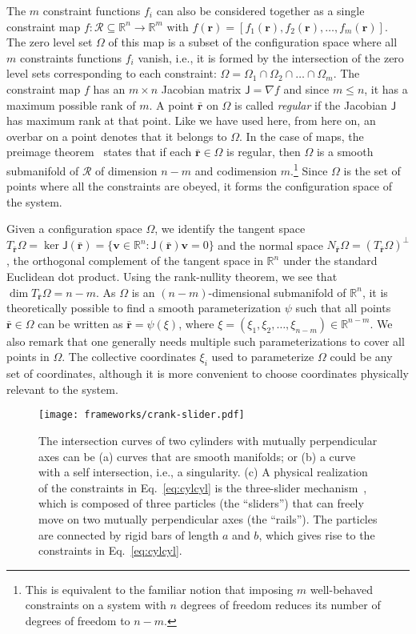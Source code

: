 The $m$ constraint functions $f_i$ can also be considered together as a single constraint map $f: \mathscr{R} \subseteq \mathbb{R}^n \to \mathbb{R}^m$ with $f(\bm{r}) = [f_1(\bm{r}), f_2(\bm{r}), \dots, f_m(\bm{r})]$.
The zero level set $\Omega$ of this map is a subset of the configuration space where all $m$ constraints functions $f_i$ vanish, i.e., it is formed by the intersection of the zero level sets corresponding to each constraint: $\Omega = \Omega_1 \cap \Omega_2 \cap \dots \cap \Omega_m$.
The constraint map $f$ has an $m\times n$ Jacobian matrix $\mathsf{J} = \nabla f$ and since $m\leq n$, it has a maximum possible rank of $m$.
A point $\bar{\bm{r}}$ on $\Omega$ is called \emph{regular} if the Jacobian $\mathsf{J}$ has maximum rank at that point.
Like we have used here, from here on, an overbar on a point denotes that it belongs to $\Omega$.
In the case of maps, the preimage theorem~\cite{lee2013} states that if each $\bar{\bm{r}} \in \Omega$ is regular, then $\Omega$ is a smooth submanifold of $\mathscr{R}$ of dimension $n - m$ and codimension $m$.\footnote{This is equivalent to the familiar notion that imposing $m$ well-behaved constraints on a system with $n$ degrees of freedom reduces its number of degrees of freedom to $n-m$.}
Since $\Omega$ is the set of points where all the constraints are obeyed, it forms the configuration space of the system.

Given a configuration space $\Omega$, we identify the tangent space $T_{\bar{\bm{r}}}\Omega = \ker{\mathsf{J}(\bar{\bm{r}})} = \{\bm{v} \in \mathbb{R}^n: \mathsf{J}(\bar{\bm{r}})\bm{v} = 0\}$ and the normal space $N_{\bar{\bm{r}}}\Omega = (T_{\bar{\bm{r}}}\Omega)^\perp$, the orthogonal complement of the tangent space in $\mathbb{R}^n$ under the standard Euclidean dot product.
Using the rank-nullity theorem, we see that $\dim T_{\bar{\bm{r}}}\Omega = n-m$.
As $\Omega$ is an $(n-m)$-dimensional submanifold of $\mathbb{R}^n$, it is theoretically possible to find a smooth parameterization $\psi$ such that all points $\bar{\bm{r}} \in \Omega$ can be written as $\bar{\bm{r}} = \psi(\xi)$, where $\xi = (\xi_1, \xi_2, \ldots, \xi_{n-m}) \in \mathbb{R}^{n-m}$.
We also remark that one generally needs multiple such parameterizations to cover all points in $\Omega$.
The collective coordinates $\xi_i$ used to parameterize $\Omega$ could be any set of coordinates, although it is more convenient to choose coordinates physically relevant to the system.
%
\begin{figure}
  \begin{center}
    \texttt{[image: frameworks/crank-slider.pdf]}
  \end{center}
  \caption{The intersection curves of two cylinders with mutually perpendicular axes can be (a) curves that are smooth manifolds; or (b) a curve with a self intersection, i.e., a singularity. (c) A physical realization of the constraints in Eq.~\eqref{eq:cylcyl} is the three-slider mechanism~\cite{bohigas2019}, which is composed of three particles (the ``sliders'') that can freely move on two mutually perpendicular axes (the ``rails'').
    The particles are connected by rigid bars of length $a$ and $b$, which gives rise to the constraints in Eq.~\eqref{eq:cylcyl}.
  }
  \label{fig:slider}
\end{figure}

